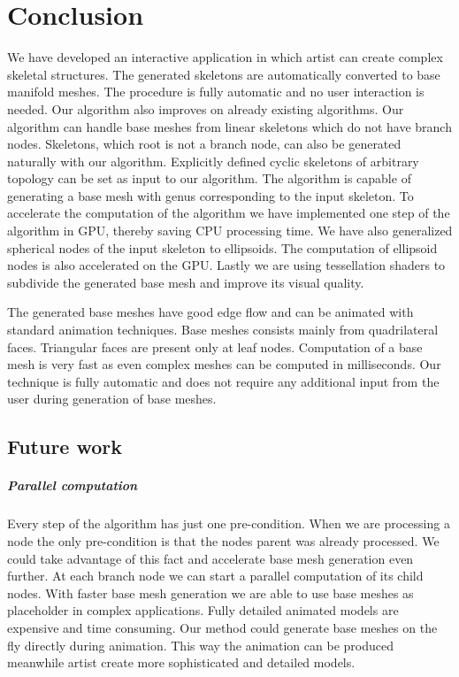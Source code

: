 \chapter{Conclusion}

We have developed an interactive application in which artist can create complex skeletal structures.
The generated skeletons are automatically converted to base manifold meshes.
The procedure is fully automatic and no user interaction is needed.
Our algorithm also improves on already existing algorithms.
Our algorithm can handle base meshes from linear skeletons which do not have branch nodes.
Skeletons, which root is not a branch node, can also be generated naturally with our algorithm.
Explicitly defined cyclic skeletons of arbitrary topology can be set as input to our algorithm.
The algorithm is capable of generating a base mesh with genus corresponding to the input skeleton.
To accelerate the computation of the algorithm we have implemented one step of the algorithm in GPU, thereby saving CPU processing time.
We have also generalized spherical nodes of the input skeleton to ellipsoids.
The computation of ellipsoid nodes is also accelerated on the GPU.
Lastly we are using tessellation shaders to subdivide the generated base mesh and improve its visual quality.

The generated base meshes have good edge flow and can be animated with standard animation techniques.
Base meshes consists mainly from quadrilateral faces.
Triangular faces are present only at leaf nodes.
Computation of a base mesh is very fast as even complex meshes can be computed in milliseconds.
Our technique is fully automatic and does not require any additional input from the user during generation of base meshes.

\section{Future work}

\paragraph{Parallel computation}
Every step of the algorithm has just one pre-condition.
When we are processing a node the only pre-condition is that the nodes parent was already processed.
We could take advantage of this fact and accelerate base mesh generation even further.
At each branch node we can start a parallel computation of its child nodes.
With faster base mesh generation we are able to use base meshes as placeholder in complex applications.
Fully detailed animated models are expensive and time consuming.
Our method could generate base meshes on the fly directly during animation.
This way the animation can be produced meanwhile artist create more sophisticated and detailed models.

